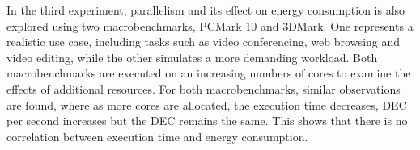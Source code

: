 In the third experiment, parallelism and its effect on energy consumption is also explored using two macrobenchmarks, PCMark 10 and 3DMark. One represents a realistic use case, including tasks such as video conferencing, web browsing and video editing, while the other simulates a more demanding workload. Both macrobenchmarks are executed on an increasing numbers of cores to examine the effects of additional resources. For both macrobenchmarks, similar observations are found, where as more cores are allocated, the execution time decreases, DEC per second increases but the DEC remains the same. This shows that there is no correlation between execution time and energy consumption. 

